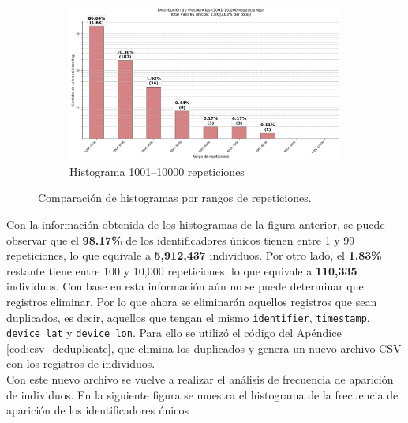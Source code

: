 \begin{figure}[htbp]
    \begin{subfigure}[t]{0.48\textwidth}
        \centering
        \includegraphics[width=\linewidth]{img/histograma_1k-10k_identifier_Mobility_Data_Slim.png}
        \caption{Histograma 1001–10000 repeticiones}
        \label{fig:sub3}
    \end{subfigure}

    \caption{Comparación de histogramas por rangos de repeticiones.}
    \label{fig:histogramas}
\end{figure}

Con la información obtenida de los histogramas de la figura anterior, se puede observar que el \textbf{98.17\%} de los identificadores únicos tienen entre 1 y 99 repeticiones, lo que equivale a \textbf{5,912,437} individuos. Por otro lado, el \textbf{1.83\%} restante tiene entre 100 y 10,000 repeticiones, lo que equivale a \textbf{110,335} individuos. Con base en esta información aún no se puede determinar que registros eliminar. Por lo que ahora se eliminarán aquellos registros que sean duplicados, es decir, aquellos que tengan el mismo 
\texttt{identifier}, \texttt{timestamp}, \texttt{device\_lat} y \texttt{device\_lon}. Para ello se utilizó el código del Apéndice \ref{cod:csv_deduplicate}, que elimina los duplicados y genera un nuevo archivo CSV con los registros de individuos. \\
Con este nuevo archivo se vuelve a realizar el análisis de frecuencia de aparición de individuos. En la siguiente figura se muestra el histograma de la frecuencia de aparición de los identificadores únicos

